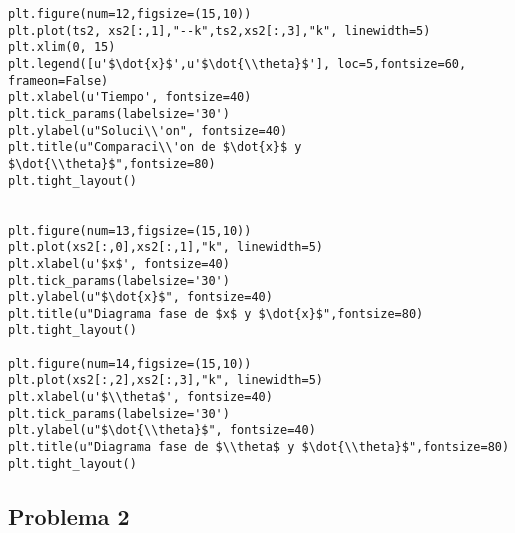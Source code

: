 \documentclass[12pt,letterpaper]{article}
\begin{document}
\begin{verbatim}
plt.figure(num=12,figsize=(15,10))
plt.plot(ts2, xs2[:,1],"--k",ts2,xs2[:,3],"k", linewidth=5)
plt.xlim(0, 15)
plt.legend([u'$\dot{x}$',u'$\dot{\\theta}$'], loc=5,fontsize=60,
frameon=False)
plt.xlabel(u'Tiempo', fontsize=40)
plt.tick_params(labelsize='30')
plt.ylabel(u"Soluci\\'on", fontsize=40)
plt.title(u"Comparaci\\'on de $\dot{x}$ y $\dot{\\theta}$",fontsize=80)
plt.tight_layout()
    
    
plt.figure(num=13,figsize=(15,10))
plt.plot(xs2[:,0],xs2[:,1],"k", linewidth=5)
plt.xlabel(u'$x$', fontsize=40)
plt.tick_params(labelsize='30')
plt.ylabel(u"$\dot{x}$", fontsize=40)
plt.title(u"Diagrama fase de $x$ y $\dot{x}$",fontsize=80)
plt.tight_layout()

plt.figure(num=14,figsize=(15,10))
plt.plot(xs2[:,2],xs2[:,3],"k", linewidth=5)
plt.xlabel(u'$\\theta$', fontsize=40)
plt.tick_params(labelsize='30')
plt.ylabel(u"$\dot{\\theta}$", fontsize=40)
plt.title(u"Diagrama fase de $\\theta$ y $\dot{\\theta}$",fontsize=80)
plt.tight_layout()  

\end{verbatim}



\subsection{Problema 2}
\end{document}
